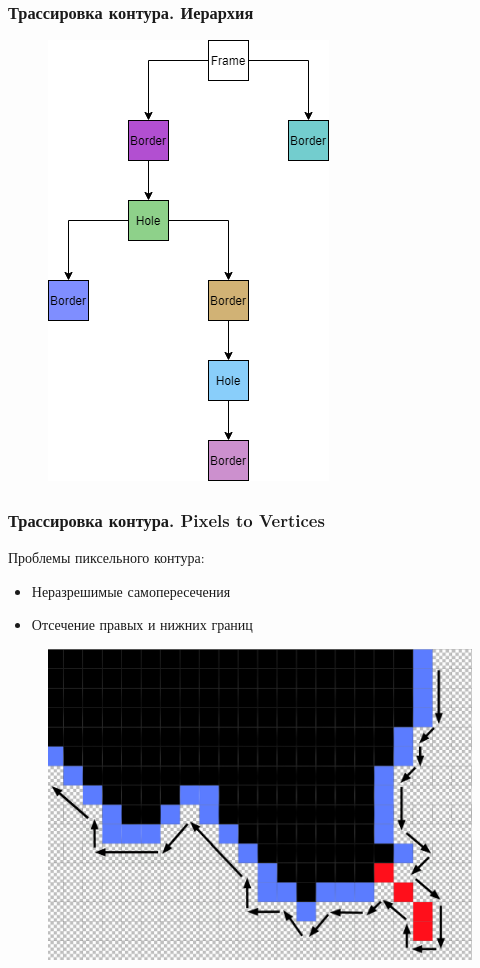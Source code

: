 \documentclass[10pt, unicode]{beamer}
\begin{document}
    \begin{frame}
        \frametitle{Трассировка контура. Иерархия}
        \begin{figure}[H]
            \centering
            \includegraphics[scale=0.65]{SuzukiExample_hierarchy.png}
        \end{figure}
    \end{frame}
    \begin{frame}
        \frametitle{Трассировка контура. Pixels to Vertices}
        Проблемы пиксельного контура:
        \begin{itemize}
            \item Неразрешимые самопересечения
            \item Отсечение правых и нижних границ
        \end{itemize}
        \begin{figure}[H]
            \centering
            \includegraphics[scale=0.25]{SelfIntersectingContour1.png}
        \end{figure}
    \end{frame}
\end{document}
